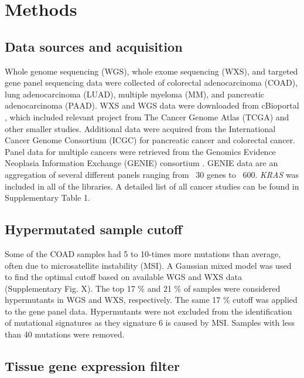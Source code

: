 \documentclass[english, 12pt, letterpaper]{article}
\newcommand{\KRAS}{\emph{KRAS}}
\begin{document}
\section*{Methods}

\subsection*{Data sources and acquisition}

Whole genome sequencing (WGS), whole exome sequencing (WXS), and targeted gene panel sequencing data were collected of colorectal adenocarcinoma (COAD), lung adenocarcinoma (LUAD), multiple myeloma (MM), and pancreatic adenocarcinoma (PAAD).
WXS and WGS data were downloaded from cBioportal \cite{Gao2013, Cerami2012}, which included relevant project from The Cancer Genome Atlas (TCGA) \cite{CancerGenomeAtlasNetwork2012, CancerGenomeAtlasResearchNetwork2014, CancerGenomeAtlasResearchNetwork.Electronicaddress:andrew_aguirredfci.harvard.edu2017} and other smaller studies. 
Additional data were acquired from the International Cancer Genome Consortium (ICGC) for pancreatic cancer \cite{Scarlett2011} and colorectal cancer. 
Panel data for multiple cancers were retrieved from the Genomics Evidence Neoplasia Information Exchange (GENIE) consortium \cite{AACRProjectGENIEConsortium2017AACRConsortium.}.
GENIE data are an aggregation of several different panels ranging from ~30 genes to ~600.
\KRAS{} was included in all of the libraries. 
A detailed list of all cancer studies can be found in Supplementary Table 1.


\subsection*{Hypermutated sample cutoff}

Some of the COAD samples had 5 to 10-times more mutations than average, often due to microsatellite instability (MSI). 
A Gaussian mixed model was used to find the optimal cutoff based on available WGS and WXS data (Supplementary Fig. X). 
The top 17 \% and 21 \% of samples were considered hypermutants in WGS and WXS, respectively.
The same 17 \% cutoff was applied to the gene panel data. 
Hypermutants were not excluded from the identification of mutational signatures as they signature 6 is caused by MSI.
Samples with less than 40 mutations were removed.


\subsection*{Tissue gene expression filter}
\end{document}
